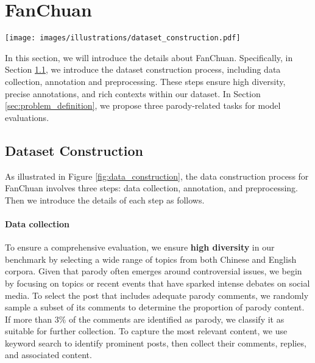 \section{FanChuan}

\begin{figure*}[htbp]
\centering
  \texttt{[image: images/illustrations/dataset\_construction.pdf]}
  \caption{The pipeline for the construction of FanChuan, which includes three key steps: data collection (left), annotation (middle), and preprocessing (right).}\vspace{-0.48cm}
  \label{fig:data_construction}
\end{figure*}


In this section, we will introduce the details about FanChuan. Specifically, in Section \ref{sec:datast_construction}, we introduce the dataset construction process, including data collection, annotation and preprocessing. These steps ensure high diversity, precise annotations, and rich contexts within our dataset. In Section \ref{sec:problem_definition}, we propose three parody-related tasks for model evaluations.

\subsection{Dataset Construction}\label{sec:datast_construction}

As illustrated in Figure \ref{fig:data_construction}, the data construction process for FanChuan involves three steps: data collection, annotation, and preprocessing. Then we introduce the details of each step as follows.

\paragraph{Data collection} To ensure a comprehensive evaluation, we ensure \textbf{high diversity} in our benchmark by selecting a wide range of topics from both Chinese and English corpora. Given that parody often emerges around controversial issues, we begin by focusing on topics or recent events that have sparked intense debates on social media. To select the post that includes adequate parody comments, we randomly sample a subset of its comments to determine the proportion of parody content. If more than $3\%$ of the comments are identified as parody, we classify it as suitable for further collection. To capture the most relevant content, we use keyword search to identify prominent posts, then collect their comments, replies, and associated content.

